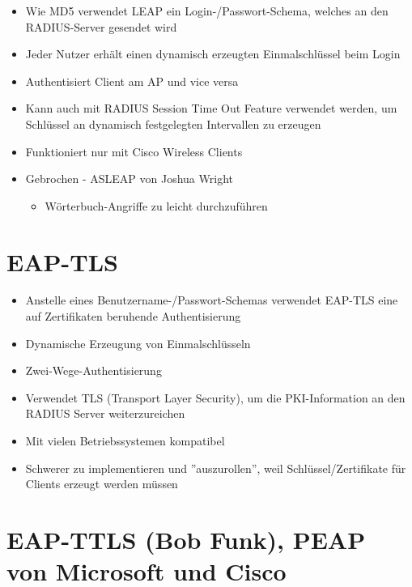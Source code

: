 \documentclass[openany]{book}
\begin{document}
\begin{itemize}
    \item Wie MD5 verwendet LEAP ein Login-/Passwort-Schema, welches an den RADIUS-Server gesendet wird
    \item Jeder Nutzer erhält einen dynamisch erzeugten Einmalschlüssel beim Login
    \item Authentisiert Client am AP und vice versa
    \item Kann auch mit RADIUS Session Time Out Feature verwendet werden, um Schlüssel an dynamisch festgelegten Intervallen zu erzeugen
    \item Funktioniert nur mit Cisco Wireless Clients
    \item Gebrochen - ASLEAP von Joshua Wright
    \begin{itemize}
        \item Wörterbuch-Angriffe zu leicht durchzuführen
    \end{itemize} 
\end{itemize}

\section{EAP-TLS}

\begin{itemize}
    \item Anstelle eines Benutzername-/Passwort-Schemas verwendet EAP-TLS eine auf Zertifikaten beruhende Authentisierung
    \item Dynamische Erzeugung von Einmalschlüsseln
    \item Zwei-Wege-Authentisierung
    \item Verwendet TLS (Transport Layer Security), um die PKI-Information an den RADIUS Server weiterzureichen
    \item Mit vielen Betriebssystemen kompatibel
    \item Schwerer zu implementieren und ''auszurollen'', weil Schlüssel/Zertifikate für Clients erzeugt werden müssen
\end{itemize}

\section{EAP-TTLS (Bob Funk), PEAP von Microsoft und Cisco}
\end{document}
